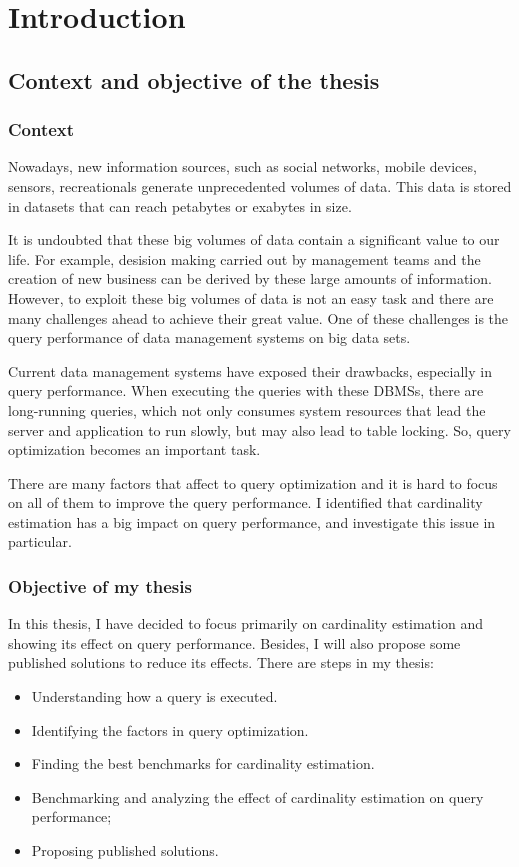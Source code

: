
\chapter{Introduction}\label{chapter:introduction}

\section{Context and objective of the thesis}

\subsection{Context}

Nowadays, new information sources, such as social networks, mobile devices,
sensors, recreationals generate unprecedented volumes of data. This data is
stored in datasets that can reach petabytes or exabytes in size. 

It is undoubted that these big volumes of data contain a significant value to our
life. For example, desision making carried out by management teams and the creation
of new business can be derived by these large amounts of information. However, to exploit
these big volumes of data is not an easy task and there are many challenges ahead to achieve their great value. One of these challenges is the query performance of data management systems on big data sets.

Current data management systems have exposed their drawbacks, especially in query performance. When executing the queries with these DBMSs, there are long-running queries, which not only consumes system resources that lead the server and application to run slowly, but may also lead to table locking. So, query optimization becomes an important task.

There are many factors that affect to query optimization and it is hard to focus
on all of them to improve the query performance. I identified
that cardinality estimation has a big impact on query performance, and investigate this issue in particular.

\subsection{Objective of my thesis}

In this thesis, I have decided to focus primarily on cardinality estimation and
showing its effect on query performance.  Besides, I will also propose some
published solutions to reduce its effects.  There are steps in my thesis:

\begin{itemize}
    \item Understanding how a query is executed.
    \item Identifying the factors in query optimization.
    \item Finding the best benchmarks for cardinality estimation.
    \item Benchmarking and analyzing the effect of cardinality estimation on
        query performance;
    \item Proposing published solutions.
\end{itemize}
